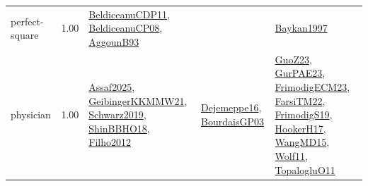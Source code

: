 {\begin{longtable}{p{3cm}r>{\raggedright\arraybackslash}p{6cm}>{\raggedright\arraybackslash}p{6cm}>{\raggedright\arraybackslash}p{8cm}}
\index{perfect-square}\index{ApplicationAreas!perfect-square}perfect-square &  1.00 & \hyperref[detail:BeldiceanuCDP11]{BeldiceanuCDP11}, \hyperref[detail:BeldiceanuCP08]{BeldiceanuCP08}, \hyperref[detail:AggounB93]{AggounB93} &  & \hyperref[detail:Baykan1997]{Baykan1997}\\
\index{physician}\index{ApplicationAreas!physician}physician &  1.00 & \hyperref[detail:Assaf2025]{Assaf2025}, \hyperref[detail:GeibingerKKMMW21]{GeibingerKKMMW21}, \hyperref[detail:Schwarz2019]{Schwarz2019}, \hyperref[detail:ShinBBHO18]{ShinBBHO18}, \hyperref[detail:Filho2012]{Filho2012} & \hyperref[detail:Dejemeppe16]{Dejemeppe16}, \hyperref[detail:BourdaisGP03]{BourdaisGP03} & \hyperref[detail:GuoZ23]{GuoZ23}, \hyperref[detail:GurPAE23]{GurPAE23}, \hyperref[detail:FrimodigECM23]{FrimodigECM23}, \hyperref[detail:FarsiTM22]{FarsiTM22}, \hyperref[detail:FrimodigS19]{FrimodigS19}, \hyperref[detail:HookerH17]{HookerH17}, \hyperref[detail:WangMD15]{WangMD15}, \hyperref[detail:Wolf11]{Wolf11}, \hyperref[detail:TopalogluO11]{TopalogluO11}\\

\end{longtable}}
